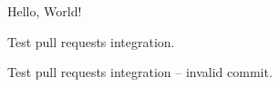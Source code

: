 \documentclass{minimal}
\begin{document}
Hello, World!

Test pull requests integration.

Test pull requests integration -- invalid commit.
\end{document}
